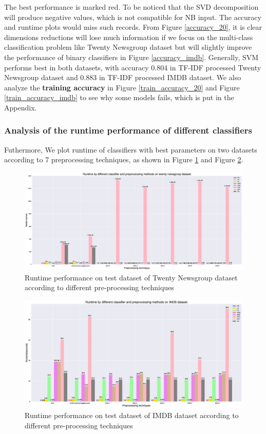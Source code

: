 \documentclass[11pt]{scrartcl}
\begin{document}
The best performance is marked red. To be noticed that the SVD decomposition will produce negative values, which is not compatible for NB input. The accuracy and runtime plots would miss such records. From Figure \ref{accuracy_20}, it is clear dimensions reductions will lose much information if we focus on the multi-class classification problem like Twenty Newsgroup dataset but will slightly improve the performance of binary classifiers in Figure \ref{accuracy_imdb}. Generally, SVM performs best in both datasets, with accuracy 0.804 in TF-IDF processed Twenty Newsgroup dataset and 0.883 in TF-IDF processed IMDB dataset. We also analyze the \textbf{training accuracy} in Figure \ref{train_accuracy_20} and Figure \ref{train_accuracy_imdb} to see why some models fails, which is put in the Appendix.

\subsubsection*{Analysis of the runtime performance of different classifiers}
Futhermore, We plot runtime of classifiers with best parameters on two datasets according to 7 preprocessing techniques, as shown in Figure \ref{runtime_20} and Figure \ref{runtime_imdb}.

\begin{figure}[H]
	\centering
	\includegraphics[width=0.9\linewidth]{fig/model_runtime_20.eps}
	\caption{Runtime performance on test dataset of Twenty Newsgroup dataset according to different pre-processing techniques}
	\label{runtime_20}
\end{figure}

\begin{figure}[H]
	\centering
	\includegraphics[width=0.9\linewidth]{fig/model_runtime_imdb.eps}
	\caption{Runtime performance on test dataset of IMDB dataset according to different pre-processing techniques}
	\label{runtime_imdb}
\end{figure}
\end{document}
